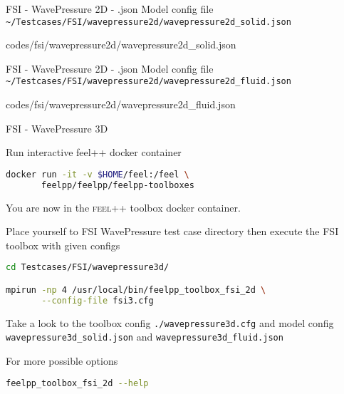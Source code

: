 \begin{frame}{FSI - WavePressure 2D - .json}
Model config file \lstinline{~/Testcases/FSI/wavepressure2d/wavepressure2d_solid.json}
\vspace{5mm}

{codes/fsi/wavepressure2d/wavepressure2d_solid.json}
\end{frame}



\begin{frame}{FSI - WavePressure 2D - .json}
Model config file \lstinline{~/Testcases/FSI/wavepressure2d/wavepressure2d_fluid.json}
\vspace{5mm}

{codes/fsi/wavepressure2d/wavepressure2d_fluid.json}
\end{frame}









\begin{frame}{FSI - WavePressure 3D}

Run  interactive feel++ docker container

\begin{lstlisting}[language=Bash,mathescape=false,emph={docker}]
docker run -it -v $HOME/feel:/feel \
       feelpp/feelpp/feelpp-toolboxes
\end{lstlisting}

You are now in the \textsc{feel++} toolbox docker container.

Place yourself to FSI WavePressure test case directory then execute the
FSI toolbox with given configs

\begin{lstlisting}[language=Bash,mathescape=false, emph={feelpp_toolbox_fsi_2d}]
cd Testcases/FSI/wavepressure3d/

mpirun -np 4 /usr/local/bin/feelpp_toolbox_fsi_2d \
       --config-file fsi3.cfg
\end{lstlisting}

Take a look to the toolbox config \lstinline{./wavepressure3d.cfg} and model config
\lstinline{wavepressure3d_solid.json} and \lstinline{wavepressure3d_fluid.json}

For more possible options
\begin{lstlisting}[language=Bash,mathescape=false, emph={feelpp_toolbox_fsi_2d}]
feelpp_toolbox_fsi_2d --help
\end{lstlisting}

\end{frame}


